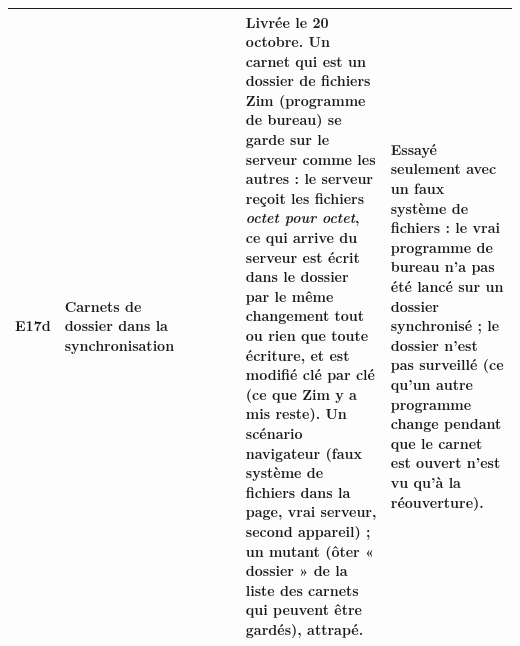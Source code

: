 \documentclass[10pt,a4paper]{article}
\newcommand{\etat}[1]{\colorbox{c#1}{\textcolor{white}{\scriptsize\textbf{\csname lbl#1\endcsname}}}}
\newcommand{\code}[1]{\texttt{\detokenize{#1}}}
\newcommand{\point}[5]{\stepcounter{n#3}#1 & \textbf{#2} & \etat{#3} & #4 & #5 \\ \midrule}
\begin{document}
{\begin{longtable}{@{}p{0.75cm} p{2.5cm} p{2.25cm} p{5.15cm} p{4.95cm}@{}}
\point{E17d}{Carnets de dossier dans la synchronisation}{fait}{Livrée le 20 octobre. Un carnet qui est un dossier de fichiers Zim (programme de bureau) se garde sur le serveur comme les autres : le serveur reçoit les fichiers \emph{octet pour octet}, ce qui arrive du serveur est écrit dans le dossier par le même changement tout ou rien que toute écriture, et \code{notebook.zim} est modifié clé par clé (ce que Zim y a mis reste). Un scénario navigateur (faux système de fichiers dans la page, vrai serveur, second appareil) ; un mutant (ôter « dossier » de la liste des carnets qui peuvent être gardés), attrapé.}{Essayé seulement avec un faux système de fichiers : le vrai programme de bureau n'a pas été lancé sur un dossier synchronisé ; le dossier n'est pas surveillé (ce qu'un autre programme change pendant que le carnet est ouvert n'est vu qu'à la réouverture).}

\end{longtable}}
\end{document}
